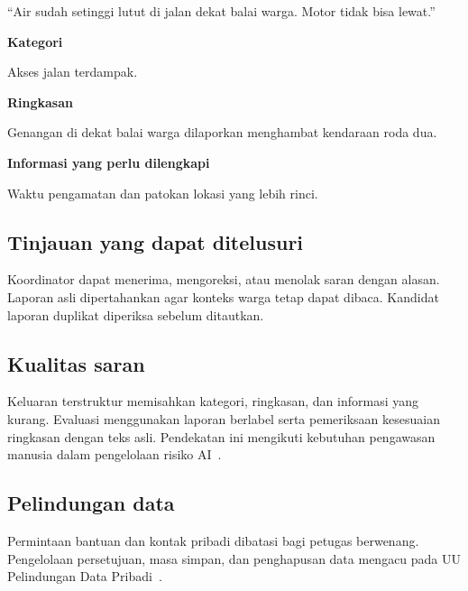 \documentclass[10pt,a4paper]{article}
\begin{document}
\begin{center}\end{center}

\begin{minipage}[t]{.48\linewidth}\vspace{0pt}\raggedright
\begin{WhiteBox}
\par
“Air sudah setinggi lutut di jalan dekat balai warga. Motor tidak bisa lewat.”
\par\textbf{Kategori}\par
Akses jalan terdampak.
\par\textbf{Ringkasan}\par
Genangan di dekat balai warga dilaporkan menghambat kendaraan roda dua.
\par\textbf{Informasi yang perlu dilengkapi}\par
Waktu pengamatan dan patokan lokasi yang lebih rinci.
\end{WhiteBox}
\end{minipage}\hfill
\begin{minipage}[t]{.48\linewidth}\vspace{0pt}\raggedright
\subsection*{Tinjauan yang dapat ditelusuri}
Koordinator dapat menerima, mengoreksi, atau menolak saran dengan alasan. Laporan asli dipertahankan agar konteks warga tetap dapat dibaca. Kandidat laporan duplikat diperiksa sebelum ditautkan.

\subsection*{Kualitas saran}
Keluaran terstruktur memisahkan kategori, ringkasan, dan informasi yang kurang. Evaluasi menggunakan laporan berlabel serta pemeriksaan kesesuaian ringkasan dengan teks asli. Pendekatan ini mengikuti kebutuhan pengawasan manusia dalam pengelolaan risiko AI~\cite{nist}.

\subsection*{Pelindungan data}
Permintaan bantuan dan kontak pribadi dibatasi bagi petugas berwenang. Pengelolaan persetujuan, masa simpan, dan penghapusan data mengacu pada UU Pelindungan Data Pribadi~\cite{uu27}.
\end{minipage}
\end{document}
